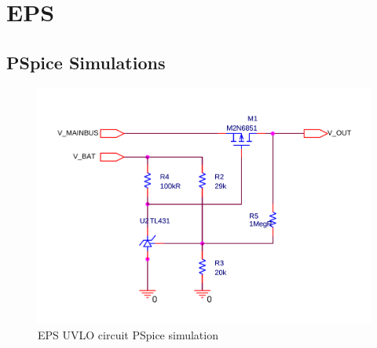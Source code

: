 \appendix

\chapter{EPS}\label{app:EPS}
%
\section{PSpice Simulations}
\label{app:EPS_PSpice}
%
%
\begin{figure}[H]
\centering
\includegraphics[scale=0.4]{figures/fig_CDR_PSpice_UVLO}
\caption{EPS UVLO circuit PSpice simulation}
\label{fig:PSpice_UVLO}
\end{figure}


